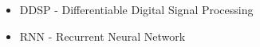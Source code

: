 
\begin{abbreviations}
\begin{itemize}
    \item DDSP - Differentiable Digital Signal Processing
    \item RNN - Recurrent Neural Network
\end{itemize}
\end{abbreviations}